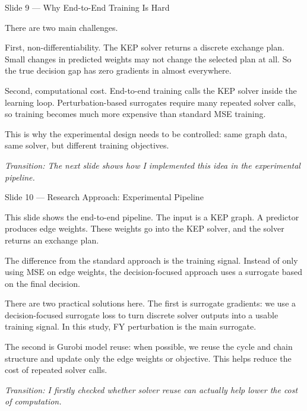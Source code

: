 \documentclass[11pt, aspectratio=169]{beamer}
\newcommand{\tr}[1]{\vspace{0.35em}\textit{\textcolor{black!55}{Transition: #1}}}
\newcommand{\timing}[1]{}
\begin{document}
\begin{frame}{Slide 9 \enspace\textmd{\small\textcolor{black!40}{--- Why End-to-End Training Is Hard}}}
\small
\timing{50 seconds}

There are two main challenges.

\vspace{0.35em}
First, non-differentiability. The KEP solver returns a discrete exchange plan.
Small changes in predicted weights may not change the selected plan at all. So
the true decision gap has zero gradients in almost everywhere.

\vspace{0.35em}
Second, computational cost. End-to-end training calls the KEP solver inside the
learning loop. Perturbation-based surrogates require many repeated solver calls,
so training becomes much more expensive than standard MSE training.

\vspace{0.35em}
This is why the experimental design needs to be controlled: same graph data,
same solver, but different training objectives.

\tr{The next slide shows how I implemented this idea in the experimental pipeline.}
\end{frame}

\begin{frame}{Slide 10 \enspace\textmd{\small\textcolor{black!40}{--- Research Approach: Experimental Pipeline}}}
\footnotesize
\timing{50 seconds}

This slide shows the end-to-end pipeline. The input is a KEP graph. A predictor
produces edge weights. These weights go into the KEP solver, and the solver
returns an exchange plan.

\vspace{0.35em}
The difference from the standard approach is the training signal. Instead of only
using MSE on edge weights, the decision-focused approach uses a surrogate based
on the final decision.

\vspace{0.35em}
There are two practical solutions here. The first is surrogate gradients: we use
a decision-focused surrogate loss to turn discrete solver outputs into a usable
training signal. In this study, FY perturbation is the main surrogate.

\vspace{0.35em}
The second is Gurobi model reuse: when possible, we reuse the cycle and chain
structure and update only the edge weights or objective. This helps reduce the
cost of repeated solver calls.

\tr{I firstly checked whether solver reuse can actually help lower the cost of computation.}
\end{frame}
\end{document}

